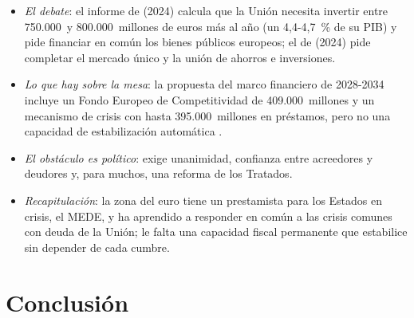 \documentclass[11pt]{article}
\begin{document}
\begin{itemize}
\item \emph{El debate}: el informe de  (2024) calcula que la Unión necesita invertir entre 750.000~y 800.000~millones de euros más al año (un 4,4-4,7~\% de su PIB) y pide financiar en común los bienes públicos europeos; el de  (2024) pide completar el mercado único y la unión de ahorros e inversiones\nocite{Draghi2024Future,Letta2024Much}.
\item \emph{Lo que hay sobre la mesa}: la propuesta del marco financiero de 2028-2034 incluye un Fondo Europeo de Competitividad de 409.000~millones y un mecanismo de crisis con hasta 395.000~millones en préstamos, pero no una capacidad de estabilización automática\nocite{CE2025MFP2028} .
\item \emph{El obstáculo es político}: exige unanimidad, confianza entre acreedores y deudores y, para muchos, una reforma de los Tratados.
\end{itemize}

\begin{itemize}
\item \emph{Recapitulación}: la zona del euro tiene un prestamista para los Estados en crisis, el MEDE, y ha aprendido a responder en común a las crisis comunes con deuda de la Unión; le falta una capacidad fiscal permanente que estabilice sin depender de cada cumbre.
\end{itemize}

\section*{Conclusión}
\end{document}
